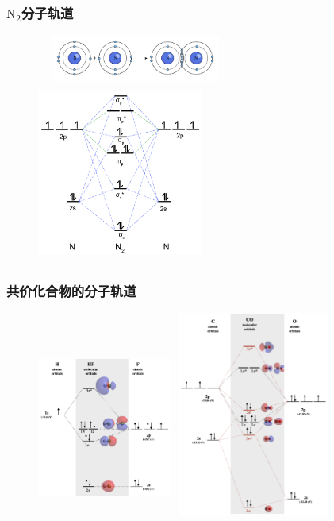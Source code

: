 {\frame
{
	\frametitle{$\mathrm{N}_2$分子轨道}
\begin{figure}[h!]
\centering
\vspace{-10.5pt}
\includegraphics[height=0.60in,width=2.55in,viewport=0 0 500 130,clip]{Figures/Octet-Rule-N2.png}
\includegraphics[height=2.30in,width=2.15in,viewport=0 0 160 150,clip]{Figures/MO-N2.png}
\label{MO:N2}
\end{figure}
}

\frame
{
	\frametitle{共价化合物的分子轨道}
\begin{figure}[h!]
\centering
\vspace{-5.5pt}
\includegraphics[height=2.30in,width=1.75in,viewport=0 0 400 460,clip]{Figures/Molecular-orbital-diagram-of-HF.png}
\includegraphics[height=2.65in,width=2.05in,viewport=0 0 560 750,clip]{Figures/Molecular-orbital-diagram-of-CO.png}
\label{MO:HF}
\end{figure}
}

}

